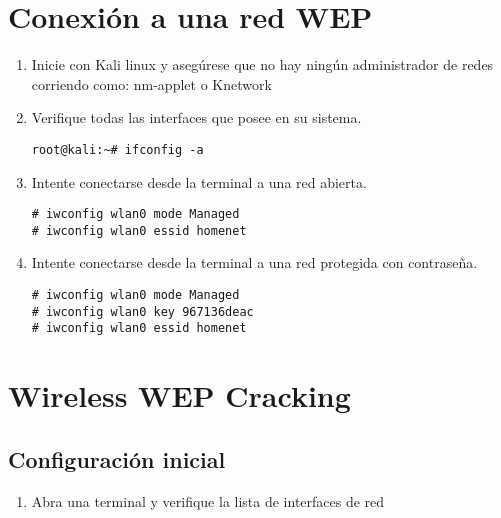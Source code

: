 \documentclass[11pt,a4paper]{scrartcl}			%
\begin{document}
\begin{multicols*}{2}

\section{Conexión a una red WEP}
\begin{enumerate}



\item Inicie con Kali linux y asegúrese que no hay ningún administrador de redes corriendo como: nm-applet o Knetwork

\item Verifique todas las interfaces que posee en su sistema.

\begin{verbatim}
root@kali:~# ifconfig -a
\end{verbatim}


\item Intente conectarse desde la terminal a una red abierta.

\begin{verbatim}
# iwconfig wlan0 mode Managed
# iwconfig wlan0 essid homenet
\end{verbatim}


\item Intente conectarse desde la terminal a una red protegida con contraseña.

\begin{verbatim}
# iwconfig wlan0 mode Managed
# iwconfig wlan0 key 967136deac
# iwconfig wlan0 essid homenet
\end{verbatim}

\end{enumerate}

\section{Wireless WEP Cracking}

\subsection{Configuración inicial}

\begin{enumerate}

\item Abra una terminal y verifique la lista de interfaces de red


\end{enumerate}
\end{multicols*}
\end{document}
